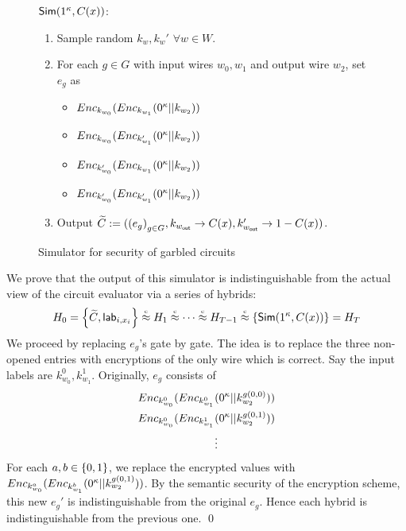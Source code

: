   \begin{figure}[H]
    \begin{minipage}[t]{\textwidth}
      $\mathsf{Sim}(1^\kappa, C(x))$:
      \begin{enumerate}
        \item
          Sample random $k_w, k_w'$ $\forall w \in W$.
        \item
          For each $g \in G$ with input wires $w_0, w_1$ and output wire $w_2$, set $e_g$ as
          \begin{itemize}
            \item
              $Enc_{k_{w_0}}(Enc_{k_{w_1}}(0^\kappa||k_{w_2}))$
            \item
              $Enc_{k_{w_0}}(Enc_{k_{w_1}'}(0^\kappa||k_{w_2}))$
            \item
              $Enc_{k_{w_0}'}(Enc_{k_{w_1}}(0^\kappa||k_{w_2}))$
            \item
              $Enc_{k_{w_0}'}(Enc_{k_{w_1}'}(0^\kappa||k_{w_2}))$
          \end{itemize}
        \item
          Output $\widetilde{C} := ({(e_g)}_{g \in G}, k_{w_{\mathsf{out}}} \rightarrow C(x), k_{w_{\mathsf{out}}}' \rightarrow 1-C(x))$.
      \end{enumerate}
    \end{minipage}
    \caption{Simulator for security of garbled circuits}
    \label{alg:sim}
  \end{figure}

  We prove that the output of this simulator is indistinguishable from the actual
  view of the circuit evaluator via a series of hybrids:
  \begin{equation*}
    H_0 = \set{\GCir, \Lab_{i, x_i} } \indis H_1 \indis \cdots \indis H_{T-1}
    \indis \set{\Sim(1^\Param, \Cir(x))} = H_T
  \end{equation*}
  We proceed by replacing $e_g$'s gate by gate. The idea is to replace the three
  non-opened entries with encryptions of the only wire which is correct. Say
  the input labels are $k_{w_0}^0, k_{w_1}^1$. Originally, $e_g$ consists of
  \begin{align*}
    Enc_{k_{w_0}^0}(Enc_{k_{w_1}^0}&{}(0^\kappa||k_{w_2}^{g(0,0)}))\\
    Enc_{k_{w_0}^0}(Enc_{k_{w_1}^1}&{}(0^\kappa||k_{w_2}^{g(0,1)}))\\
                                     &{}\vdots
  \end{align*}
  For each $a,b \in \left\{0,1\right\}$, we replace the encrypted values with
  $Enc_{k_{w_0}^a}(Enc_{k_{w_1}^b}(0^\kappa||k_{w_2}^{g(0,1)}))$. By the semantic security
  of the encryption scheme, this new $e_g'$ is indistinguishable from the original
  $e_g$. Hence each hybrid is indistinguishable from the previous one.
  \qed


